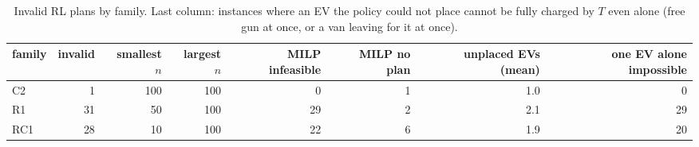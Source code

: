 \begin{table}[H]\centering
\caption{Invalid RL plans by family. Last column: instances where an EV the policy could not place cannot be fully charged by $T$ even alone (free gun at once, or a van leaving for it at once).}\label{tab:invalid}
\begin{adjustbox}{max width=\textwidth}\begin{tabular}{lrrrrrrr}\toprule
family & invalid & smallest $n$ & largest $n$ & MILP infeasible & MILP no plan & unplaced EVs (mean) & one EV alone impossible \\ \midrule
C2 & 1 & 100 & 100 & 0 & 1 & 1.0 & 0 \\
R1 & 31 & 50 & 100 & 29 & 2 & 2.1 & 29 \\
RC1 & 28 & 10 & 100 & 22 & 6 & 1.9 & 20 \\
\bottomrule\end{tabular}\end{adjustbox}\end{table}
